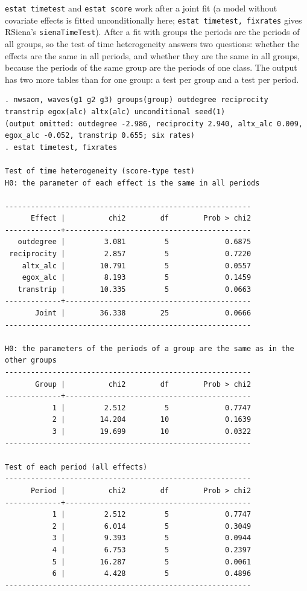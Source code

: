 \texttt{estat timetest} and \texttt{estat score} work after a joint fit (a model without covariate effects is fitted unconditionally here; \texttt{estat timetest, fixrates} gives RSiena's \texttt{sienaTimeTest}). After a fit with groups the periods are the periods of all groups, so the test of time heterogeneity answers two questions: whether the effects are the same in all periods, and whether they are the same in all groups, because the periods of the same group are the periods of one class. The output has two more tables than for one group: a test per group and a test per period.
\begin{lstlisting}
. nwsaom, waves(g1 g2 g3) groups(group) outdegree reciprocity transtrip egox(alc) altx(alc) unconditional seed(1)
(output omitted: outdegree -2.986, reciprocity 2.940, altx_alc 0.009, egox_alc -0.052, transtrip 0.655; six rates)
. estat timetest, fixrates

Test of time heterogeneity (score-type test)
H0: the parameter of each effect is the same in all periods

---------------------------------------------------------
      Effect |          chi2        df        Prob > chi2
-------------+-------------------------------------------
   outdegree |         3.081         5             0.6875
 reciprocity |         2.857         5             0.7220
    altx_alc |        10.791         5             0.0557
    egox_alc |         8.193         5             0.1459
   transtrip |        10.335         5             0.0663
-------------+-------------------------------------------
       Joint |        36.338        25             0.0666
---------------------------------------------------------

H0: the parameters of the periods of a group are the same as in the other groups
---------------------------------------------------------
       Group |          chi2        df        Prob > chi2
-------------+-------------------------------------------
           1 |         2.512         5             0.7747
           2 |        14.204        10             0.1639
           3 |        19.699        10             0.0322
---------------------------------------------------------

Test of each period (all effects)
---------------------------------------------------------
      Period |          chi2        df        Prob > chi2
-------------+-------------------------------------------
           1 |         2.512         5             0.7747
           2 |         6.014         5             0.3049
           3 |         9.393         5             0.0944
           4 |         6.753         5             0.2397
           5 |        16.287         5             0.0061
           6 |         4.428         5             0.4896
---------------------------------------------------------
\end{lstlisting}
